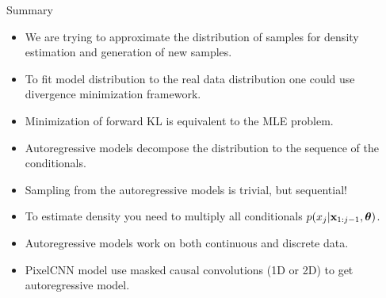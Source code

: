 \begin{frame}{Summary}
    \begin{itemize}
    	\item We are trying to approximate the distribution of samples for density estimation and generation of new samples.
    	\vfill
    	\item To fit model distribution to the real data distribution one could use divergence minimization framework.
    	\vfill
    	\item Minimization of forward KL is equivalent to the MLE problem.
    	\vfill
    	\item Autoregressive models decompose the distribution to the sequence of the conditionals.
    	 \vfill
        \item Sampling from the autoregressive models is trivial, but sequential!
        \vfill
        \item To estimate density you need to multiply all conditionals $p(x_j | \mathbf{x}_{1:j - 1}, \boldsymbol{\theta})$.
        \vfill
        \item Autoregressive models work on both continuous and discrete data.
        \vfill
     	\item PixelCNN model use masked causal convolutions (1D or 2D) to get autoregressive model.
    \end{itemize}
\end{frame}

 
